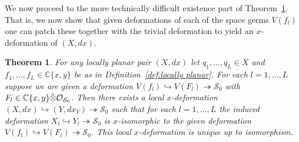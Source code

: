 \documentclass[11pt,twoside]{amsart}
\theoremstyle{plain}
\newtheorem{theorem}{Theorem}[section]
\newcommand{\Sm}{\mathcal{S}}
\newcommand{\Sh}[1]{\mathcal{#1}} %
\newcommand{\dfx}{dx}
\begin{document}
 
We now proceed to the more technically difficult existence part of Theorem~\ref {equivalent deformation}. That is, we now show that given deformations of each of the space germs $V(f_l)$ one can patch these together with the trivial deformation to yield an  $ x $-deformation of $(X,\dfx)$.%
\begin{theorem}\label{equivalent deformation}
For any locally planar pair $(X,\dfx)$ let $q_1,\ldots,q_L\in X$ and $f_1,\ldots,f_L\in\mathbb{C}\{x,y\}$ be as in Definition~\ref{def:locally planar}. For each $l=1,\ldots,L$ suppose we are given a deformation $V(f_l)\hookrightarrow V(F_l)\twoheadrightarrow\Sm_0$ with $F_l\in\mathbb{C}\{x,y\}\Hat{\otimes}\Sh{O}_{\Sm_0}$. Then there exists a local $x$-deformation $(X,\dfx)\hookrightarrow(Y,\dfx_Y)\twoheadrightarrow\Sm_0$ such that for each $l=1,\dots,L$ the induced deformation $X_l \hookrightarrow Y_l \twoheadrightarrow\Sm_0$ is $x$-isomorphic to the given deformation
$V(f_l) \hookrightarrow V(F_l) \twoheadrightarrow\Sm_0$. This local $x$-deformation is unique up to isomorphism. 
%
%
% 
\end{theorem}
\end{document}
